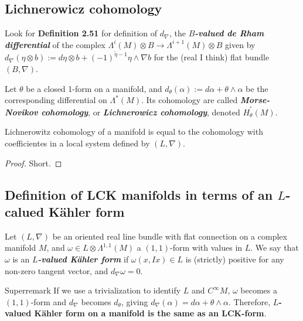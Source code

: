 \subsection{Lichnerowicz cohomology}

Look for  \textbf{Definition 2.51} for definition of \(d_\nabla\), the \textit{\textbf{\(B\)-valued de Rham differential}} of the complex \(\Lambda^{i}(M) \otimes B \longrightarrow \Lambda^{i+1}(M) \otimes B\) given by \(d_\nabla(\eta \otimes b):=d \eta \otimes b +(-1)^{\tilde{\eta}-1}\eta \wedge \nabla b\) for the (real I think) flat bundle \((B,\nabla)\).

\begin{defn}\leavevmode
	Let \(\theta\) be a closed 1-form on a manifold, and \(d_\theta(\alpha):= d \alpha + \theta \wedge \alpha\) be the corresponding differential on \(\Lambda^{*}(M)\). Its cohomology are called \textit{\textbf{Morse-Novikov cohomology}}, or  \textit{\textbf{Lichnerowicz cohomology}}, denoted \(H^{^*}_\theta(M)\).
\end{defn}

\begin{thm}\leavevmode
	Lichnerowitz cohomology of a manifold is equal to the cohomology with coefficientes in a local system defined by \((L,\nabla)\).
\end{thm}

\begin{proof}\leavevmode
Short.
\end{proof}

\subsection{Definition of LCK manifolds in terms of an  \(L\)-calued Kähler form}

\begin{defn}\leavevmode
	Let \((L,\nabla)\) be an oriented real line bundle with flat connection on a complex manifold \(M\), and \(\omega \in L \otimes \Lambda^{ 1,1}(M)\) a \((1,1)\)-form with values in \(L\). We say that \(\omega\) is an \textit{\textbf{\(L\)-valued Kähler form}} if \(\omega(x, Ix) \in L\) is (strictly) positive for any non-zero tangent vector, and \(d_\nabla \omega =0\).
\end{defn}

\begin{thing6}{Superremark}\leavevmode
If we use a trivialization to identify \(L\) and \(C^\infty M\), \(\omega\) becomes a \((1,1)\)-form and \(d_\nabla\) becomes \(d_\theta\), giving \(d_\nabla(\alpha)= d\alpha + \theta \wedge \alpha\). Therefore, \textbf{\(L\)-valued Kähler form on a manifold is the same as an LCK-form}.
\end{thing6}

